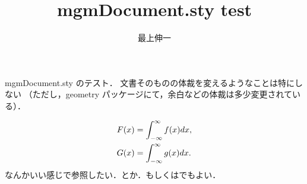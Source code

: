 \documentclass{jsarticle}
\title{mgmDocument.sty test}
\author{最上伸一}
\begin{document}
\maketitle

mgmDocument.sty のテスト．
文書そのものの体裁を変えるようなことは特にしない
（ただし，geometry パッケージにて，余白などの体裁は多少変更されている）．

\begin{align}
F(x)&=\inti f(x)dx,\elbl{sore}\\
G(x)&=\inti g(x)dx.\elbl{na}
\end{align} 
なんかいい感じで参照したい．とか．もしくはでもよい．
\end{document}
